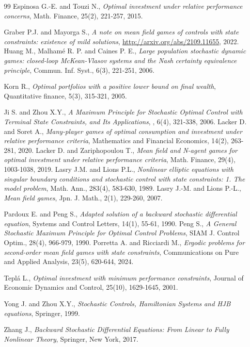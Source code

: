 \documentclass[11pt,a4paper]{article}
\begin{document}
\begin{thebibliography}{99}
  Espinosa G.-E.  and Touzi N.,
 \textit{Optimal investment under relative performance concerns}, Math. Finance, 25(2), 221-257, 2015.


Graber P.J. and Mayorga S.,
\textit{A note on mean field games of controls with state constraints: existence of mild solutions}, \url{http://arxiv.org/abs/2109.11655}, 2022.
Huang M., Malham\'e R. P. and Caines P. E., \textit{Large population stochastic dynamic games: closed-loop McKean-Vlasov systems and the Nash certainty equivalence principle}, Commun. Inf. Syst., 6(3), 221-251, 2006.

Korn R., \textit{Optimal portfolios with a positive lower bound on final wealth}, Quantitative finance, 5(3), 315-321, 2005.

Ji S. and Zhou X.Y.,
  \textit{A Maximum Principle for Stochastic Optimal Control with Terminal State Constraints, and Its Applications},
, 6(4), 321-338, 2006.
  Lacker D. and Soret A., \textit{Many-player games of optimal consumption and investment under relative performance criteria},  Mathematics and Financial Economics, 14(2),  263-281, 2020.
  Lacker D. and Zariphopoulou T., \textit{Mean field and N-agent games for optimal investment under relative performance criteria},  Math. Finance,  29(4),  1003-1038, 2019.
  Lasry J.M. and Lions P.L., \textit{Nonlinear elliptic equations with singular boundary conditions and stochastic control with state constraints: 1. The model problem},  Math. Ann., 283(4),  583-630, 1989.
Lasry J.-M. and Lions P.-L.,  \textit{Mean field games}, Jpn. J. Math., 2(1), 229-260, 2007.


Pardoux E. and Peng S., \textit{Adapted solution of a backward stochastic differential equation}, Systems and Control Letters, 14(1), 55-61, 1990.
 Peng S.,
  \textit{A General Stochastic Maximum Principle for Optimal Control Problems}, SIAM J. Control Optim., 28(4), 966-979, 1990. 
 Porretta A. and  Ricciardi M., 
  \textit{Ergodic problems for second-order mean field games with state constraints}, Communications on Pure and Applied Analysis,  23(5), 620-644, 2024. 

 Tepl\'a L., \textit{Optimal investment with minimum performance constraints}, Journal of Economic Dynamics and Control, 25(10), 1629-1645, 2001.
  
  Yong J. and Zhou X.Y.,
  \textit{Stochastic Controls, Hamiltonian Systems and HJB equations}, Springer, 1999.

  Zhang J.,
  \textit{Backward Stochastic Differential Equations: From Linear to Fully Nonlinear Theory}, Springer, New York, 2017.

\end{thebibliography}
\end{document}
